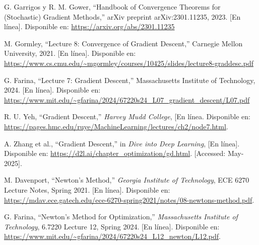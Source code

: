 \documentclass[conference]{IEEEtran}
\begin{document}
\begin{thebibliography}{00}
 G. Garrigos y R. M. Gower, “Handbook of Convergence Theorems for (Stochastic) Gradient Methods,” arXiv preprint arXiv:2301.11235, 2023. [En línea]. Disponible en: \url{https://arxiv.org/abs/2301.11235}

 M. Gormley, “Lecture 8: Convergence of Gradient Descent,” Carnegie Mellon University, 2021. [En línea]. Disponible en: \url{https://www.cs.cmu.edu/~mgormley/courses/10425/slides/lecture8-graddesc.pdf}

 G. Farina, “Lecture 7: Gradient Descent,” Massachusetts Institute of Technology, 2024. [En línea]. Disponible en: \url{https://www.mit.edu/~gfarina/2024/67220s24_L07_gradient_descent/L07.pdf }

R. U. Yeh, “Gradient Descent,” \textit{Harvey Mudd College}, [En línea. Disponible en: \url{https://pages.hmc.edu/ruye/MachineLearning/lectures/ch2/node7.html}.

A. Zhang et al., “Gradient Descent,” in \textit{Dive into Deep Learning}, [En línea]. Disponible en: \url{https://d2l.ai/chapter_optimization/gd.html}. [Accessed: May-2025].

M. Davenport, “Newton’s Method,” \textit{Georgia Institute of Technology}, ECE 6270 Lecture Notes, Spring 2021. [En línea]. Disponible en: \url{https://mdav.ece.gatech.edu/ece-6270-spring2021/notes/08-newtons-method.pdf}.

G. Farina, “Newton’s Method for Optimization,” \textit{Massachusetts Institute of Technology}, 6.7220 Lecture 12, Spring 2024. [En línea]. Disponible en: \url{https://www.mit.edu/~gfarina/2024/67220s24_L12_newton/L12.pdf}.

\end{thebibliography}
\end{document}
